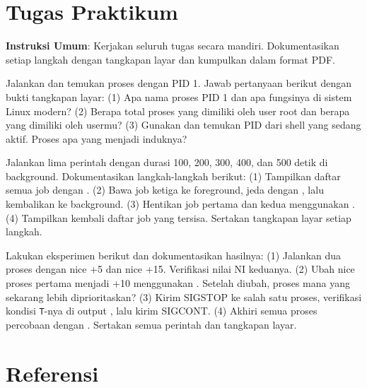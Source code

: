 \section{Tugas Praktikum}
\label{sec:process-exercises}

\textbf{Instruksi Umum}: Kerjakan seluruh tugas secara mandiri. Dokumentasikan setiap
langkah dengan tangkapan layar dan kumpulkan dalam format PDF.

\begin{exercisebox}
Jalankan  dan temukan proses dengan PID 1. Jawab pertanyaan berikut
dengan bukti tangkapan layar: (1) Apa nama proses PID 1 dan apa fungsinya di sistem
Linux modern? (2) Berapa total proses yang dimiliki oleh user root dan berapa yang
dimiliki oleh usermu? (3) Gunakan  dan temukan PID dari shell yang sedang
aktif. Proses apa yang menjadi induknya?
\end{exercisebox}

\begin{exercisebox}
Jalankan lima perintah  dengan durasi 100, 200, 300, 400, dan 500 detik di
background. Dokumentasikan langkah-langkah berikut: (1) Tampilkan daftar semua job
dengan . (2) Bawa job ketiga ke foreground, jeda dengan ,
lalu kembalikan ke background. (3) Hentikan job pertama dan kedua menggunakan .
(4) Tampilkan kembali daftar job yang tersisa. Sertakan tangkapan layar setiap langkah.
\end{exercisebox}

\begin{exercisebox}
Lakukan eksperimen berikut dan dokumentasikan hasilnya: (1) Jalankan dua proses
 dengan nice +5 dan nice +15. Verifikasi nilai NI keduanya. (2) Ubah nice
proses pertama menjadi +10 menggunakan . Setelah diubah, proses mana yang
sekarang lebih diprioritaskan? (3) Kirim SIGSTOP ke salah satu proses, verifikasi kondisi
\texttt{T}-nya di output , lalu kirim SIGCONT. (4) Akhiri semua proses percobaan
dengan . Sertakan semua perintah dan tangkapan layar.
\end{exercisebox}

\section{Referensi}
\label{sec:process-references}

